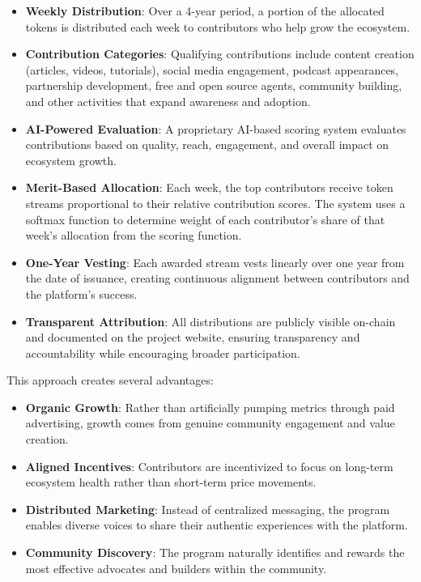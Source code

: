 \documentclass{article}
\begin{document}
\begin{itemize}
    \item \textbf{Weekly Distribution}: Over a 4-year period, a portion of the allocated tokens is distributed each week to contributors who help grow the ecosystem.

    \item \textbf{Contribution Categories}: Qualifying contributions include content creation (articles, videos, tutorials), social media engagement, podcast appearances, partnership development, free and open source agents, community building, and other activities that expand awareness and adoption.

    \item \textbf{AI-Powered Evaluation}: A proprietary AI-based scoring system evaluates contributions based on quality, reach, engagement, and overall impact on ecosystem growth.

    \item \textbf{Merit-Based Allocation}: Each week, the top contributors receive token streams proportional to their relative contribution scores. The system uses a softmax function to determine weight of each contributor's share of that week's allocation from the scoring function.

    \item \textbf{One-Year Vesting}: Each awarded stream vests linearly over one year from the date of issuance, creating continuous alignment between contributors and the platform's success.

    \item \textbf{Transparent Attribution}: All distributions are publicly visible on-chain and documented on the project website, ensuring transparency and accountability while encouraging broader participation.
\end{itemize}

This approach creates several advantages:

\begin{itemize}
    \item \textbf{Organic Growth}: Rather than artificially pumping metrics through paid advertising, growth comes from genuine community engagement and value creation.

    \item \textbf{Aligned Incentives}: Contributors are incentivized to focus on long-term ecosystem health rather than short-term price movements.

    \item \textbf{Distributed Marketing}: Instead of centralized messaging, the program enables diverse voices to share their authentic experiences with the platform.

    \item \textbf{Community Discovery}: The program naturally identifies and rewards the most effective advocates and builders within the community.
\end{itemize}
\end{document}
